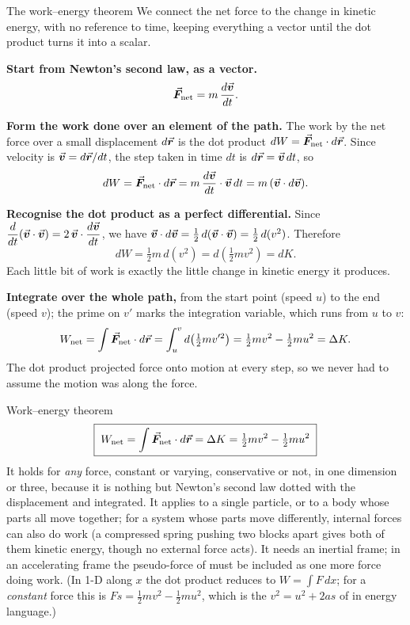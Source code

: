 \begin{derivbox}{The work--energy theorem}
We connect the net force to the change in kinetic energy, with no reference to time, keeping everything
a vector until the dot product turns it into a scalar.

 \textbf{Start from Newton's second law, as a vector.}
\[
\vec{\bm{F}}_{\text{net}}=m\,\frac{d\vec{\bm{v}}}{dt}.
\]

 \textbf{Form the work done over an element of the path.} The work by the net force over a small
displacement $d\vec{\bm{r}}$ is the dot product $dW=\vec{\bm{F}}_{\text{net}}\cdot d\vec{\bm{r}}$. Since velocity is $\vec{\bm{v}}=d\vec{\bm{r}}/dt$,
the step taken in time $dt$ is $d\vec{\bm{r}}=\vec{\bm{v}}\,dt$, so
\[
dW=\vec{\bm{F}}_{\text{net}}\cdot d\vec{\bm{r}}=m\,\frac{d\vec{\bm{v}}}{dt}\cdot\vec{\bm{v}}\,dt=m\,(\vec{\bm{v}}\cdot d\vec{\bm{v}}).
\]

 \textbf{Recognise the dot product as a perfect differential.} Since
$\dfrac{d}{dt}(\vec{\bm{v}}\cdot\vec{\bm{v}})=2\,\vec{\bm{v}}\cdot\dfrac{d\vec{\bm{v}}}{dt}$, we have $\vec{\bm{v}}\cdot d\vec{\bm{v}}=\tfrac12\,d(\vec{\bm{v}}\cdot\vec{\bm{v}})
=\tfrac12\,d(v^2)$. Therefore
\[
dW=\tfrac12 m\,d(v^2)=d\!\left(\tfrac12 m v^2\right)=dK.
\]
Each little bit of work is exactly the little change in kinetic energy it produces.

 \textbf{Integrate over the whole path,} from the start point (speed $u$) to the end (speed $v$);
the prime on $v'$ marks the integration variable, which runs from $u$ to $v$:
\[
W_{\text{net}}=\int \vec{\bm{F}}_{\text{net}}\cdot d\vec{\bm{r}}=\int_{u}^{v} d\!\left(\tfrac12 m v'^2\right)
=\tfrac12 m v^2-\tfrac12 m u^2=\Delta K.
\]
The dot product projected force onto motion at every step, so we never had to assume the motion was
along the force.
\end{derivbox}

\begin{keybox}{Work--energy theorem}
\[
\boxed{\;W_{\text{net}}=\int\vec{\bm{F}}_{\text{net}}\cdot d\vec{\bm{r}}=\Delta K=\tfrac12 mv^2-\tfrac12 mu^2\;}
\]
It holds for \emph{any} force, constant or varying, conservative or not, in one dimension or three,
because it is nothing but Newton's second law dotted with the displacement and integrated. It applies to
a single particle, or to a body whose parts all move together; for a system whose parts move differently,
internal forces can also do work (a compressed spring pushing two blocks apart gives both of them kinetic
energy, though no external force acts). It needs an inertial frame; in an accelerating frame the
pseudo-force of  must be included as one more force doing work. (In 1-D along $x$
the dot product reduces to $W=\int F\,dx$; for a \emph{constant} force this is
$Fs=\tfrac12mv^2-\tfrac12mu^2$, which is the $v^2=u^2+2as$ of  in energy
language.)
\end{keybox}

